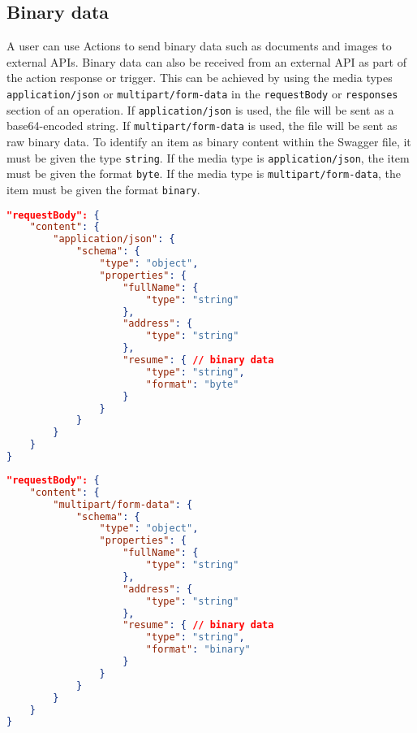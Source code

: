 \subsection{Binary data}
A user can use Actions to send binary data such as documents and images to external APIs. Binary data can also be received from an external API as part of the action response or trigger. This can be achieved by using the media types \texttt{application/json} or \texttt{multipart/form-data} in the \texttt{requestBody} or \texttt{responses} section of an operation. If \texttt{application/json} is used, the file will be sent as a base64-encoded string. If \texttt{multipart/form-data} is used, the file will be sent as raw binary data. To identify an item as binary content within the Swagger file, it must be given the type \texttt{string}. If the media type is \texttt{application/json}, the item must be given the format \texttt{byte}. If the media type is \texttt{multipart/form-data}, the item must be given the format \texttt{binary}.\\
\begin{minipage}{\textwidth}
\begin{lstlisting}[caption={Defining files in JSON data},label={code:binaryinjson},language=json]
"requestBody": {
    "content": {
        "application/json": {
            "schema": {
                "type": "object",
                "properties": {
                    "fullName": {
                        "type": "string"
                    },
                    "address": {
                        "type": "string"
                    },
                    "resume": { // binary data
                        "type": "string",
                        "format": "byte"
                    }
                }
            }
        }
    }
}
\end{lstlisting}
\end{minipage}
\begin{minipage}{\textwidth}
\begin{lstlisting}[caption={Defining files in a form post},label={code:binaryinmultipart},language=json]
"requestBody": {
    "content": {
        "multipart/form-data": {
            "schema": {
                "type": "object",
                "properties": {
                    "fullName": {
                        "type": "string"
                    },
                    "address": {
                        "type": "string"
                    },
                    "resume": { // binary data
                        "type": "string",
                        "format": "binary"
                    }
                }
            }
        }
    }
}
\end{lstlisting}
\end{minipage}